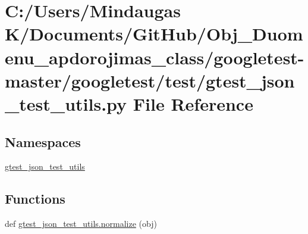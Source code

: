 \hypertarget{googletest-master_2googletest_2test_2gtest__json__test__utils_8py}{}\section{C\+:/\+Users/\+Mindaugas K/\+Documents/\+Git\+Hub/\+Obj\+\_\+\+Duomenu\+\_\+apdorojimas\+\_\+class/googletest-\/master/googletest/test/gtest\+\_\+json\+\_\+test\+\_\+utils.py File Reference}
\label{googletest-master_2googletest_2test_2gtest__json__test__utils_8py}
\subsection*{Namespaces}
\begin{DoxyCompactItemize}
\item 
 \mbox{\hyperlink{namespacegtest__json__test__utils}{gtest\+\_\+json\+\_\+test\+\_\+utils}}
\end{DoxyCompactItemize}
\subsection*{Functions}
\begin{DoxyCompactItemize}
\item 
def \mbox{\hyperlink{namespacegtest__json__test__utils_a339ba380c6799ecba1a9c9b396020573}{gtest\+\_\+json\+\_\+test\+\_\+utils.\+normalize}} (obj)
\end{DoxyCompactItemize}
